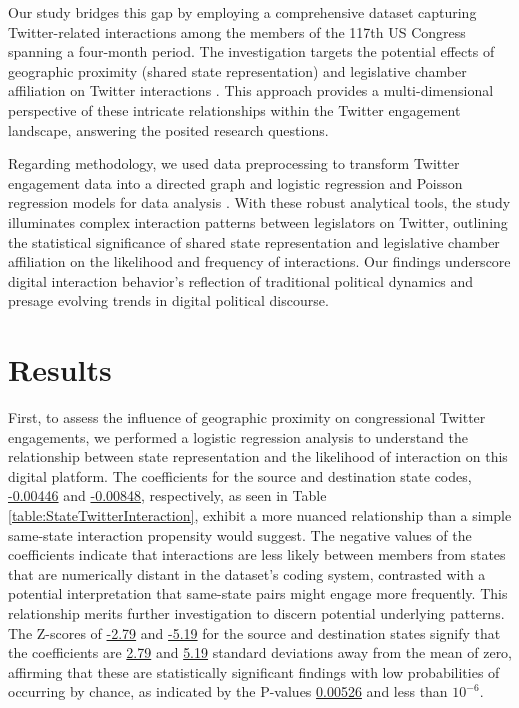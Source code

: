 \documentclass[11pt]{article}
\begin{document}
Our study bridges this gap by employing a comprehensive dataset capturing Twitter-related interactions among the members of the 117th US Congress spanning a four-month period. The investigation targets the potential effects of geographic proximity (shared state representation) and legislative chamber affiliation on Twitter interactions \cite{Hua2020TowardsMA, Pierri2020AMA, Beers2023FollowbackCS}. This approach provides a multi-dimensional perspective of these intricate relationships within the Twitter engagement landscape, answering the posited research questions.

Regarding methodology, we used data preprocessing to transform Twitter engagement data into a directed graph and logistic regression and Poisson regression models for data analysis \cite{Hayes2009ComputationalPF, Ovaskainen2010ModelingSC, Park2008PenalizedLR}. With these robust analytical tools, the study illuminates complex interaction patterns between legislators on Twitter, outlining the statistical significance of shared state representation and legislative chamber affiliation on the likelihood and frequency of interactions. Our findings underscore digital interaction behavior's reflection of traditional political dynamics and presage evolving trends in digital political discourse.

\section*{Results}

First, to assess the influence of geographic proximity on congressional Twitter engagements, we performed a logistic regression analysis to understand the relationship between state representation and the likelihood of interaction on this digital platform. The coefficients for the source and destination state codes, \hyperlink{A0b}{-0.00446} and \hyperlink{A0c}{-0.00848}, respectively, as seen in Table \ref{table:StateTwitterInteraction}, exhibit a more nuanced relationship than a simple same-state interaction propensity would suggest. The negative values of the coefficients indicate that interactions are less likely between members from states that are numerically distant in the dataset's coding system, contrasted with a potential interpretation that same-state pairs might engage more frequently. This relationship merits further investigation to discern potential underlying patterns. The Z-scores of \hyperlink{A2b}{-2.79} and \hyperlink{A2c}{-5.19} for the source and destination states signify that the coefficients are \hyperlink{A2b}{2.79} and \hyperlink{A2c}{5.19} standard deviations away from the mean of zero, affirming that these are statistically significant findings with low probabilities of occurring by chance, as indicated by the P-values \hyperlink{A3b}{0.00526} and less than \hyperlink{A3c}{$10^{-6}$}.
\end{document}
